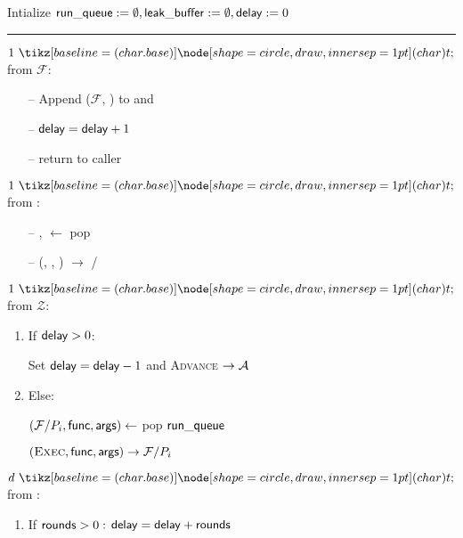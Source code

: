 \begin{minipage}{0.5\textwidth}
\begin{bbox}[title={\textbf{Wrapper} $\Wasync$} ]

Intialize ${\mathsf {run\_queue}} := \emptyset, {\mathsf {leak\_buffer}} := \emptyset, {\mathsf {delay}} := 0$

\vspace{2mm} \hrule \vspace{2mm}

\OnInput {} \color{red} $1 \token$ \color{black} from $\mathcal{F}$:
	\begin{itemize}[leftmargin=*]
		\item[--] Append ($\mathcal{F}$, ) to  and 
		\item[--] ${\mathsf {delay}} = {\mathsf {delay}} + 1$
		\item[--] return to caller
	\end{itemize}


\OnInput {} \color{red} $1 \token$ \color{black} from \A:
	\begin{itemize}[leftmargin=*]
		\item[--] \F,  $\leftarrow$ pop  
		\item[--] \Send (\Exec, , ) $\rightarrow$ \F/\Partyi
	\end{itemize}

\OnInput {} \color{red} $1 \token$ \color{black} from $\mathcal{Z}$:
	\begin{enumerate}
		\item If ${\mathsf {delay}} > 0$:

			\quad  Set ${\mathsf {delay}} = {\mathsf {delay}} - 1$ and \Send \textsc{Advance} $\rightarrow \mathcal{A}$

		\item Else:
			
			\quad $(\mathcal{F}/P_i, {\mathsf {func}}, {\mathsf {args}}) \leftarrow$ pop ${\mathsf {run\_queue}}$

			\quad \Send $(\textsc{Exec}, {\mathsf {func}}, {\mathsf {args}}) \rightarrow \mathcal{F}/P_i$
	\end{enumerate}

\OnInput {} \color{red} $d \token$ \color{black} from \A:
	\begin{enumerate}
		\item If ${\mathsf {rounds}} > 0:$ ${\mathsf {delay}} = {\mathsf {delay}} + {\mathsf {rounds}}$
	\end{enumerate}

\end{bbox}
\end{minipage}
